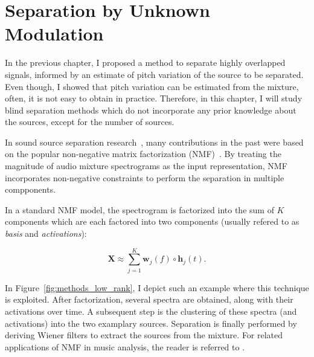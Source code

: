 \chapter{Separation by Unknown Modulation}
\label{cha:unknown}

In the previous chapter, I proposed a method to separate highly overlapped signals, informed by an estimate of pitch variation of the source to be separated.
Even though, I showed that pitch variation can be estimated from the mixture, often, it is not easy to obtain in practice.
Therefore, in this chapter, I will study blind separation methods which do not incorporate any prior knowledge about the sources, except for the number of sources.
\par
In sound source separation research~\cite{vincent14}, many contributions in the past were based on the popular non-negative matrix factorization (NMF)~\cite{lee99,lee01}.
By treating the magnitude of audio mixture spectrograms as the input representation, NMF incorporates non-negative constraints to perform the separation in multiple compponents.

In a standard NMF model, the spectrogram is factorized into the sum of $K$ components which are each factored into two components (usually refered to as \emph{basis} and \emph{activations}):

\begin{equation}
   \mathbf{X} \approx \sum\limits_{j=1}^{K} \mathbf{w}_{j}(f) \circ  \mathbf{h}_{j}(t).
   \label{eq:vanilla_nmf}
\end{equation}


In Figure~\ref{fig:methods_low_rank}, I depict such an example where this technique is exploited.
After factorization, several spectra are obtained, along with their activations over time.
A subsequent step is the clustering of these spectra (and activations) into the two examplary sources.
Separation is finally performed by deriving Wiener filters to extract the sources from the mixture.
For related applications of NMF in music analysis, the reader is referred to \cite{smaragdis03,virtanen07,fevotte09}.

